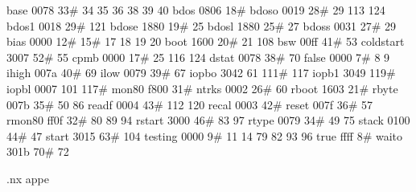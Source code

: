 base              0078           33#     34      35      36      38   39   40
bdos              0806           18#
bdoso             0019           28#     29     113     124
bdos1             0018           29#    121
bdose             1880           19#     25
bdosl             1880           25#     27
bdoss             0031           27#     29
bias              0000           12#     15#     17      18      19   20
boot              1600           20#     21     108
bsw               00ff           41#     53
coldstart         3007           52#     55
cpmb              0000           17#     25     116     124
dstat             0078           38#     70
false             0000            7#      8       9
ihigh             007a           40#     69
ilow              0079           39#     67
iopbo             3042           61     111#    117
iopb1             3049          119#
iopbl             0007          101     117#
mon80             f800           31#
ntrks             0002           26#     60
rboot             1603           21#    
rbyte             007b           35#     50      86
readf             0004           43#    112     120
recal             0003           42#
reset             007f           36#     57
rmon80            ff0f           32#     80      89      94
rstart            3000           46#     83      97
rtype             0079           34#     49      75
stack             0100           44#     47
start             3015           63#    104
testing           0000            9#     11      14      79      82   93   96
true              ffff            8#  
waito             301b           70#     72

.nx appe
